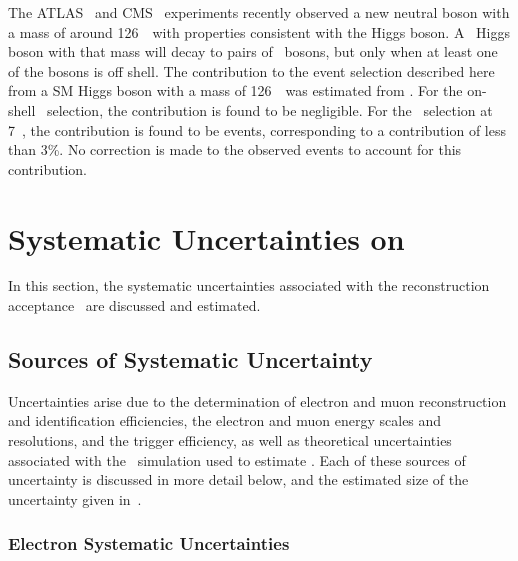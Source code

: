 The ATLAS~\cite{ATLAS_Higgs:2012gk} and CMS~\cite{CMS_Higgs:2012gu} experiments
recently observed a new neutral boson with a mass of around 126~\gev\ with
properties consistent with the Higgs boson. A \sm\ Higgs boson with that mass will
decay to pairs of \Z\ bosons, but only when at least one of the bosons is off
shell. The contribution to the event selection described here from a SM Higgs
boson with a mass of 126~\gev\ was estimated from \mc. For the on-shell \ZZ\
selection, the contribution is found to be negligible. For the \ZZs\ selection
at 7~\tev, the contribution is found to be \measStat{1.7}{\errSym{0.03}} events,
corresponding to a contribution of less than 3\%. No correction is made to the
observed events to account for this contribution.

\section{Systematic Uncertainties on \CZZ}

In this section, the systematic uncertainties associated with the reconstruction
acceptance \CZZ\ are discussed and estimated. %

\subsection{Sources of Systematic Uncertainty}

Uncertainties arise due to the determination of
electron and muon reconstruction and identification efficiencies, the electron
and muon energy scales and resolutions, and the trigger efficiency, as well as
theoretical uncertainties associated with the \mc\ simulation used to estimate
\CZZ. Each of these sources of uncertainty is discussed in more detail below,
and the estimated size of the uncertainty given
in~.

\subsubsection{Electron Systematic Uncertainties}

